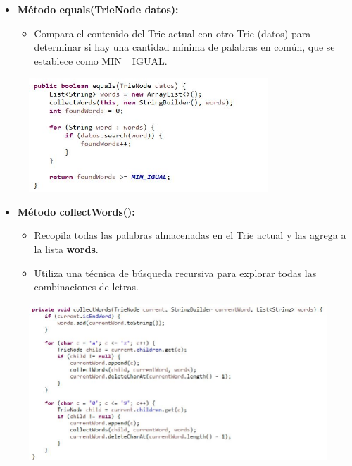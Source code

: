 \documentclass{article}
\begin{document}
	\begin{itemize}
	\item \textbf{Método equals(TrieNode datos):}
	 \begin{itemize}
	 \item Compara el contenido del Trie actual con otro Trie (datos) para determinar si hay una cantidad mínima de palabras en común, que se establece como MIN\_ IGUAL.
	 \end{itemize}
	\end{itemize}
	 \begin{figure}[H]
		\centering
		\includegraphics[width=0.8\textwidth,keepaspectratio]{img/TN7.jpg}
	\end{figure}
	\clearpage
	
	\begin{itemize}
	\item \textbf{Método collectWords():}
	 \begin{itemize}
	 \item Recopila todas las palabras almacenadas en el Trie actual y las agrega a la lista \textbf{words}. 
	 \item Utiliza una técnica de búsqueda recursiva para explorar todas las combinaciones de letras.
	 \end{itemize}
	\end{itemize}
	 \begin{figure}[H]
		\centering
		\includegraphics[width=1\textwidth,keepaspectratio]{img/TN8.jpg}
	\end{figure}
	
\end{document}
